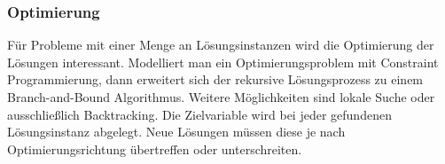 \subsubsection{Optimierung}
Für Probleme mit einer Menge an Lösungsinstanzen wird die Optimierung der Lösungen interessant. Modelliert man ein Optimierungsproblem mit Constraint Programmierung, dann erweitert sich der rekursive Lösungsprozess zu einem Branch-and-Bound Algorithmus. Weitere Möglichkeiten sind lokale Suche oder ausschließlich Backtracking.  Die Zielvariable wird bei jeder gefundenen Lösungsinstanz abgelegt. Neue Lösungen müssen diese je nach Optimierungsrichtung übertreffen oder unterschreiten.










